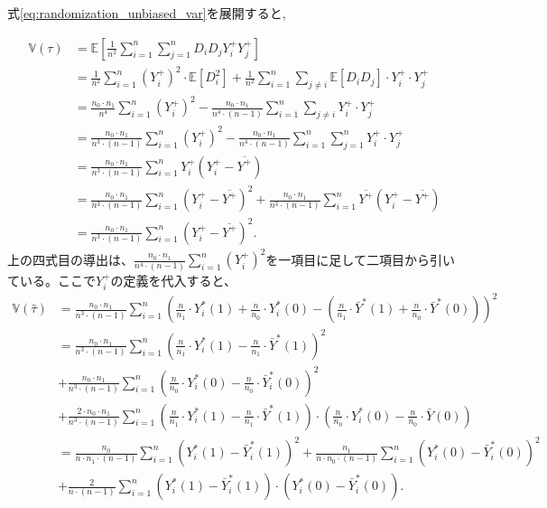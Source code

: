 \documentclass[a4paper]{bxjsarticle}
\begin{document}
式\eqref{eq:randomization_unbiased_var}を展開すると,

\begin{equation}
\begin{split}
\mathbb{V}(\tau) &= \mathbb{E} \left [\frac{1}{n^2} \sum_{i=1}^n \sum_{j=1}^n D_i D_j Y_i^+ Y_j^+ \right] \\
&= \frac{1}{n^2}\sum_{i=1}^n (Y_i^+)^2 \cdot \mathbb{E} \left[ D_i^2 \right] + \frac{1}{n^2}\sum_{i=1}^n\sum_{j\neq{i}} \mathbb{E} \left[ D_i D_j \right] \cdot Y_i^+ \cdot Y_j^+ \\
&= \frac{n_0 \cdot n_1}{n^4} \sum_{i=1}^n (Y_i^+)^2 - \frac{n_0 \cdot n_1}{n^4 \cdot (n-1)} \sum_{i=1}^n \sum_{j\neq i}Y_i^+ \cdot Y_j^+ \\
&=\frac{n_0 \cdot n_1}{n^3 \cdot (n-1)} \sum_{i=1}^n (Y_i^+)^2 - \frac{n_0 \cdot n_1}{n^4 \cdot (n-1)} \sum_{i=1}^n \sum_{j = 1}^n Y_i^+ \cdot Y_j^+ \\
&=\frac{n_0 \cdot n_1}{n^3 \cdot (n-1)}\sum_{i=1}^n Y_i^+(Y_i^+ - \overline{Y^+})\\
&=\frac{n_0 \cdot n_1}{n^3 \cdot (n-1)}\sum_{i=1}^n (Y_i^+ - \overline{Y^+})^2 + \frac{n_0 \cdot n_1}{n^3 \cdot (n-1)}\sum_{i=1}^n \overline{Y^+}(Y_i^+ - \overline{Y^+})\\
&=\frac{n_0 \cdot n_1}{n^3 \cdot (n-1)}\sum_{i=1}^n (Y_i^+ - \overline{Y^+})^2.
\end{split}
\end{equation}
上の四式目の導出は、$\frac{n_0 \cdot n_1}{n^4 \cdot (n-1)} \sum_{i=1}^n (Y_i^+)^2$を一項目に足して二項目から引いている。ここで$Y_i^+$の定義を代入すると、
\begin{equation}
\begin{split}
\mathbb{V}(\hat{\tau}) &=\frac{n_0 \cdot n_1}{n^3 \cdot (n-1)} \sum_{i=1}^n \left(\frac{n}{n_1}\cdot Y_i^\ast(1) + \frac{n}{n_0}\cdot Y_i^\ast(0) - \left(\frac{n}{n_1}\cdot \bar{Y}^\ast(1) + \frac{n}{n_0}\cdot \bar{Y}^\ast(0) \right) \right)^2 \\
&=\frac{n_0\cdot n_1}{n^3 \cdot (n-1)} \sum_{i=1}^n \left(\frac{n}{n_1}\cdot Y_i^\ast(1) - \frac{n}{n_1} \cdot \bar{Y}^\ast(1) \right)^2 \\
&+ \frac{n_0 \cdot n_1}{n^3 \cdot (n-1)}\sum_{i=1}^n \left(\frac{n}{n_0}\cdot Y_i^\ast(0) - \frac{n}{n_0}\cdot \bar{Y}_i^\ast(0) \right)^2 \\
&+\frac{2\cdot n_0\cdot n_1}{n^3 \cdot (n-1)} \sum_{i=1}^n \left(\frac{n}{n_1}\cdot Y_i^\ast(1) - \frac{n}{n_1} \cdot \bar{Y}^\ast(1) \right) \cdot \left(\frac{n}{n_0}\cdot Y_i^\ast(0) - \frac{n}{n_0}\cdot \bar{Y}(0) \right) \\
&= \frac{n_0}{n \cdot n_1 \cdot (n-1)} \sum_{i=1}^n \left(Y_i^\ast(1) - \bar{Y}_i^\ast(1)\right)^2 + \frac{n_1}{n \cdot n_0 \cdot (n-1)} \sum_{i=1}^n \left(Y_i^\ast(0) - \bar{Y}_i^\ast(0)\right)^2 \\
&+ \frac{2}{n \cdot (n-1)} \sum_{i=1}^n \left(Y_i^\ast(1) - \bar{Y}_i^\ast(1)\right)  \cdot \left(Y_i^\ast(0) - \bar{Y}_i^\ast(0)\right).
\end{split}
\end{equation}
\end{document}
